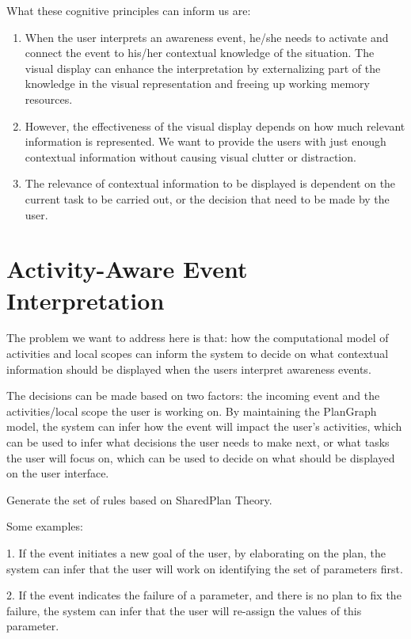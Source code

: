 What these cognitive principles can inform us are:
\begin{enumerate}
	\item When the user interprets an awareness event, he/she needs to activate and connect the event to his/her contextual knowledge of the situation. The visual display can enhance the interpretation by externalizing part of the knowledge in the visual representation and freeing up working memory resources.
	\item However, the effectiveness of the visual display depends on how much relevant information is represented. We want to provide the users with just enough contextual information without causing visual clutter or distraction.
	\item The relevance of contextual information to be displayed is dependent on the current task to be carried out, or the decision that need to be made by the user.

\end{enumerate}

\section{Activity-Aware Event Interpretation} %
\label{sec:activity_aware_event_interpretation}
The problem we want to address here is that: how the computational model of activities and local scopes can inform the system to decide on what contextual information should be displayed when the users interpret awareness events.

The decisions can be made based on two factors: the incoming event and the activities/local scope the user is working on. By maintaining the PlanGraph model, the system can infer how the event will impact the user's activities, which can be used to infer what decisions the user needs to make next, or what tasks the user will focus on, which can be used to decide on what should be displayed on the user interface.

Generate the set of rules based on SharedPlan Theory.

Some examples:

1. If the event initiates a new goal of the user, by elaborating on the plan, the system can infer that the user will work on identifying the set of parameters first.

2. If the event indicates the failure of a parameter, and there is no plan to fix the failure, the system can infer that the user will re-assign the values of this parameter.

